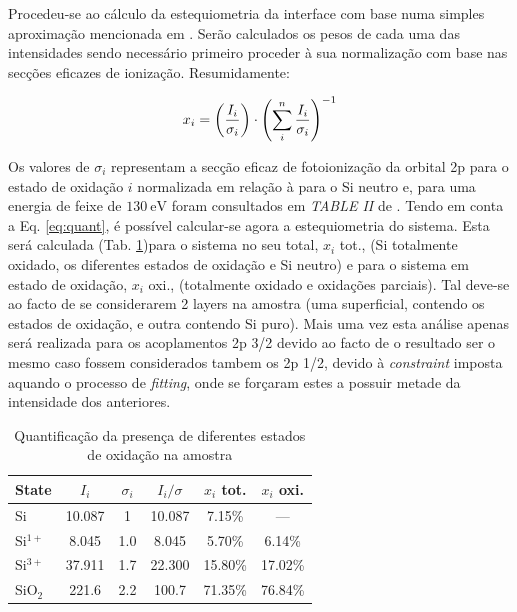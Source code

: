 \documentclass[baaa]{baaa}
\begin{document}
Procedeu-se ao cálculo da estequiometria da interface com base numa simples aproximação mencionada em \cite{Himpsel}. Serão calculados os pesos de cada uma das intensidades sendo necessário primeiro proceder à sua normalização com base nas secções eficazes de ionização. Resumidamente:

\begin{gather}
  x_i= \qty(\frac{I_i}{\sigma_i})\cdot\qty(\sum_i^n \frac{I_i}{\sigma_i})^{-1}
  \label{eq:quant}
\end{gather}

Os valores de $\sigma_i$ representam a secção eficaz de fotoionização da orbital 2p para o estado de oxidação $i$ normalizada em relação à para o Si neutro e, para uma energia de feixe de $130\ \si{\electronvolt}$ foram consultados em \textit{TABLE II} de \cite{Himpsel}. Tendo em conta a Eq. \ref{eq:quant}, é possível calcular-se agora a estequiometria do sistema. Esta será calculada (Tab. \ref{table:esteq})para o sistema no seu total, $x_i$ tot., (Si totalmente oxidado, os diferentes estados de oxidação e Si neutro) e para o sistema em estado de oxidação, $x_i$ oxi., (totalmente oxidado e oxidações parciais). Tal deve-se ao facto de se considerarem 2 layers na amostra (uma superficial, contendo os estados de oxidação, e outra contendo Si puro). Mais uma vez esta análise apenas será realizada para os acoplamentos 2p 3/2 devido ao facto de o resultado ser o mesmo caso fossem considerados tambem os 2p 1/2, devido à \textit{constraint} imposta aquando o processo de \textit{fitting}, onde se forçaram estes a possuir metade da intensidade dos anteriores.




\begin{table}[h!]
  \centering
  \caption{Quantificação da presença de diferentes estados de oxidação na amostra}
  \begin{tabular}{lccccc}
    \hline\hline\noalign{\smallskip}
    State & $I_i$ &$\sigma_i$& $I_i/\sigma$& $x_i$ tot.&$x_i$ oxi.\\
    \hline\noalign{\smallskip}
    Si &10.087&1& 10.087&7.15\%&---\\
    Si$^{1+}$&8.045&1.0& 8.045 &5.70\% &6.14\%\\
    Si$^{3+}$&37.911&1.7&22.300&15.80\%&17.02\%\\
    SiO$_2$ &221.6&2.2&100.7&71.35\%&76.84\%\\
    \hline
    \end{tabular}
    \label{table:esteq}
\end{table}
\end{document}
